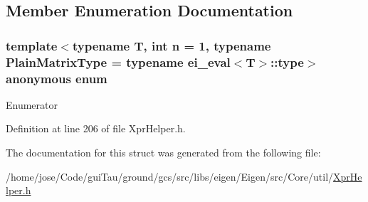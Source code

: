 \subsection{Member Enumeration Documentation}
\hypertarget{structei__nested_a8da76f8f3a4e163edeb9b0b10fc8b5dc}{\subsubsection[{anonymous enum}]{\setlength{\rightskip}{0pt plus 5cm}template$<$typename T, int n = 1, typename Plain\-Matrix\-Type = typename ei\-\_\-eval$<$\-T$>$\-::type$>$ anonymous enum}}\label{structei__nested_a8da76f8f3a4e163edeb9b0b10fc8b5dc}
\begin{Desc}
\item[Enumerator]\par
\begin{description}
\item[{\em 
\hypertarget{structei__nested_a8da76f8f3a4e163edeb9b0b10fc8b5dcaec244fd3b7aa9674b042735eeecd1b5f}{Cost\-Eval}\label{structei__nested_a8da76f8f3a4e163edeb9b0b10fc8b5dcaec244fd3b7aa9674b042735eeecd1b5f}
}]\item[{\em 
\hypertarget{structei__nested_a8da76f8f3a4e163edeb9b0b10fc8b5dca058231aeb5e203adb89baae216bd3c6f}{Cost\-No\-Eval}\label{structei__nested_a8da76f8f3a4e163edeb9b0b10fc8b5dca058231aeb5e203adb89baae216bd3c6f}
}]\end{description}
\end{Desc}


Definition at line 206 of file Xpr\-Helper.\-h.



The documentation for this struct was generated from the following file\-:\begin{DoxyCompactItemize}
\item 
/home/jose/\-Code/gui\-Tau/ground/gcs/src/libs/eigen/\-Eigen/src/\-Core/util/\hyperlink{_xpr_helper_8h}{Xpr\-Helper.\-h}\end{DoxyCompactItemize}
